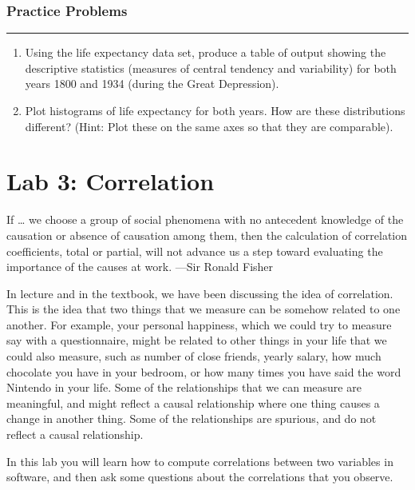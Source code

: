 \documentclass[
]{book}
\begin{document}
\hypertarget{practice-problems}{%
\subsection{Practice Problems}\label{practice-problems}}

\begin{center}\rule{0.5\linewidth}{0.5pt}\end{center}

\begin{enumerate}
\def\labelenumi{\arabic{enumi}.}
\item
  Using the life expectancy data set, produce a table of output showing the descriptive statistics (measures of central tendency and variability) for both years 1800 and 1934 (during the Great Depression).
\item
  Plot histograms of life expectancy for both years. How are these distributions different? (Hint: Plot these on the same axes so that they are comparable).
\end{enumerate}

\hypertarget{lab-3-correlation}{%
\chapter{Lab 3: Correlation}\label{lab-3-correlation}}

{If \ldots{} we choose a group of social phenomena with no antecedent knowledge of the causation or absence of causation among them, then the calculation of correlation coefficients, total or partial, will not advance us a step toward evaluating the importance of the causes at work. ---Sir Ronald Fisher}

In lecture and in the textbook, we have been discussing the idea of correlation. This is the idea that two things that we measure can be somehow related to one another. For example, your personal happiness, which we could try to measure say with a questionnaire, might be related to other things in your life that we could also measure, such as number of close friends, yearly salary, how much chocolate you have in your bedroom, or how many times you have said the word Nintendo in your life. Some of the relationships that we can measure are meaningful, and might reflect a causal relationship where one thing causes a change in another thing. Some of the relationships are spurious, and do not reflect a causal relationship.

In this lab you will learn how to compute correlations between two variables in software, and then ask some questions about the correlations that you observe.
\end{document}
